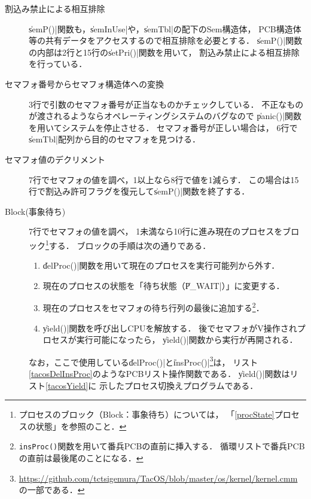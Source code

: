 \begin{description}
\item [割込み禁止による相互排除]
  \|semP()|関数も，\|semInUse|や，\|semTbl|の配下のSem構造体，
  PCB構造体等の共有データをアクセスするので相互排除を必要とする．
  \|semP()|関数の内部は2行と15行の\|setPri()|関数を用いて，
  割込み禁止による相互排除を行っている．

\item [セマフォ番号からセマフォ構造体への変換]
  3行で引数のセマフォ番号が正当なものかチェックしている．
  不正なものが渡されるようならオペレーティングシステムのバグなので
  \|panic()|関数を用いてシステムを停止させる．
  セマフォ番号が正しい場合は，
  6行で\|semTbl|配列から目的のセマフォを見つける．

\item [セマフォ値のデクリメント]
  7行でセマフォの値を調べ，1以上なら8行で値を1減らす．
  この場合は15行で割込み許可フラグを復元して\|semP()|関数を終了する．

\item [Block(事象待ち)]
  7行でセマフォの値を調べ，
  1未満なら10行に進み現在のプロセスをブロック\footnote{
    プロセスのブロック（Block：事象待ち）については，
    「\ref{procState}プロセスの状態」を参照のこと．}する．
  ブロックの手順は次の通りである．

  \begin{enumerate}
  \item \|delProc()|関数を用いて現在のプロセスを実行可能列から外す．
  \item 現在のプロセスの状態を「待ち状態（\|P_WAIT|）」に変更する．
  \item 現在のプロセスをセマフォの待ち行列の最後に追加する\footnote{
    \texttt{insProc()}関数を用いて番兵PCBの直前に挿入する．
    循環リストで番兵PCBの直前は最後尾のことになる．}．
  \item \|yield()|関数を呼び出しCPUを解放する．
    後でセマフォがV操作されプロセスが実行可能になったら，
    \|yield()|関数から実行が再開される．
  \end{enumerate}

  なお，ここで使用している\|delProc()|と\|insProc()|\footnote{
  \url{https://github.com/tctsigemura/TacOS/blob/master/os/kernel/kernel.cmm}
  の一部である．}は，
  リスト\ref{tacosDelInsProc}のようなPCBリスト操作関数である．
  \|yield()|関数はリスト\ref{tacosYield}に
  示したプロセス切換えプログラムである．

  
\end{description}


